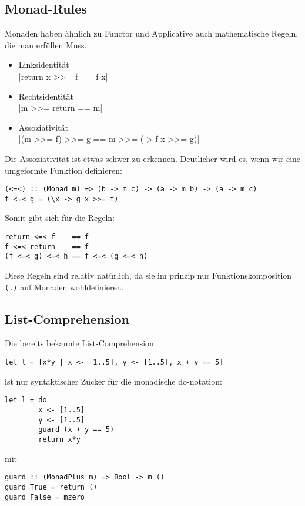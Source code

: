 \documentclass{beamer}
\begin{document}
\subsection{Monad-Rules}
\begin{frame}[fragile]
Monaden haben ähnlich zu Functor und Applicative auch mathematische Regeln, die man erfüllen Muss.\\
\begin{itemize}
 \item Linksidentität\\
       |return x >>= f == f x|
 \item Rechtsidentität\\
       |m >>= return == m|
 \item Assoziativität\\
       |(m >>= f) >>= g == m >>= (\x -> f x >>= g)|
\end{itemize}
\pause
Die Assoziativität ist etwas schwer zu erkennen. Deutlicher wird es, wenn wir eine umgeformte Funktion definieren:
\begin{verbatim}
(<=<) :: (Monad m) => (b -> m c) -> (a -> m b) -> (a -> m c)
f <=< g = (\x -> g x >>= f)
\end{verbatim}
\end{frame}

\begin{frame}[fragile]
Somit gibt sich für die Regeln:
\begin{verbatim}
return <=< f    == f
f <=< return    == f
(f <=< g) <=< h == f <=< (g <=< h)
\end{verbatim}
\pause
Diese Regeln sind relativ \glqq natürlich\grqq , da sie im prinzip nur Funktionskomposition \texttt{(.)} auf Monaden wohldefinieren.
\end{frame}

\subsection{List-Comprehension}
\begin{frame}[fragile]
Die bereits bekannte List-Comprehension
\begin{verbatim}
let l = [x*y | x <- [1..5], y <- [1..5], x + y == 5]
\end{verbatim}
ist nur syntaktischer Zucker für die monadische do-notation:
\begin{verbatim}
let l = do
        x <- [1..5]
        y <- [1..5]
        guard (x + y == 5)
        return x*y
\end{verbatim}
mit
\begin{verbatim}
guard :: (MonadPlus m) => Bool -> m ()
guard True = return ()
guard False = mzero
\end{verbatim}

\end{frame}
\end{document}
